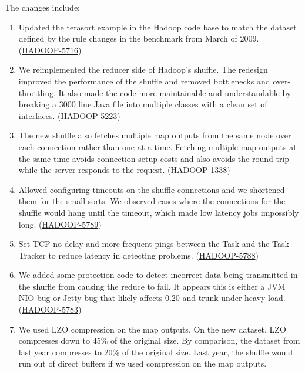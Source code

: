 \documentclass{article}
\begin{document}
The changes include:

\begin{enumerate}

\item Updated the terasort example in the Hadoop code base to match
  the dataset defined by the rule changes in the benchmark from March
  of 2009.
  (\href{http://issues.apache.org/jira/browse/HADOOP-5716}{HADOOP-5716})

\item We reimplemented the reducer side of Hadoop's shuffle. The
  redesign improved the performance of the shuffle and removed
  bottlenecks and over-throttling. It also made the code more
  maintainable and understandable by breaking a 3000 line Java file
  into multiple classes with a clean set of interfaces.
  (\href{http://issues.apache.org/jira/browse/HADOOP-5223}{HADOOP-5223})

\item The new shuffle also fetches multiple map outputs from the same
  node over each connection rather than one at a time. Fetching
  multiple map outputs at the same time avoids connection setup costs
  and also avoids the round trip while the server responds to the request.
  (\href{http://issues.apache.org/jira/browse/HADOOP-1338}{HADOOP-1338})
  
\item Allowed configuring timeouts on the shuffle connections and we
  shortened them for the small sorts. We observed cases where the
  connections for the shuffle would hang until the timeout, which made
  low latency jobs impossibly long.
  (\href{http://issues.apache.org/jira/browse/HADOOP-5789}{HADOOP-5789})

\item Set TCP no-delay and more frequent pings between the Task and
  the Task Tracker to reduce latency in detecting problems.
  (\href{http://issues.apache.org/jira/browse/HADOOP-5788}{HADOOP-5788})

\item We added some protection code to detect incorrect data being
  transmitted in the shuffle from causing the reduce to fail. It
  appears this is either a JVM NIO bug or Jetty bug that likely
  affects 0.20 and trunk under heavy load.
  (\href{http://issues.apache.org/jira/browse/HADOOP-5783}{HADOOP-5783})

\item We used LZO compression on the map outputs. On the new dataset, LZO
  compresses down to 45\% of the original size. By comparison, the
  dataset from last year compresses to 20\% of the original size. Last
  year, the shuffle would run out of direct buffers if we used
  compression on the map outputs.


\end{enumerate}
\end{document}
